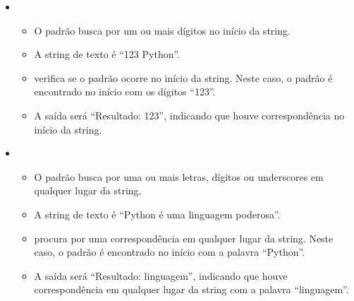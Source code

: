 \documentclass[letterpaper,10pt,english]{jupyterBook}
\begin{document}
\sphinxAtStartPar
{}
\begin{itemize}
\item {} 
\sphinxAtStartPar
{}
\begin{itemize}
\item {} 
\sphinxAtStartPar
O padrão  busca por um ou mais dígitos no início da string.

\item {} 
\sphinxAtStartPar
A string de texto é “123 Python”.

\item {} 
\sphinxAtStartPar
{} verifica se o padrão ocorre no início da string. Neste caso, o padrão é encontrado no início com os dígitos “123”.

\item {} 
\sphinxAtStartPar
A saída será “Resultado: 123”, indicando que houve correspondência no início da string.

\end{itemize}

\item {} 
\sphinxAtStartPar
{}
\begin{itemize}
\item {} 
\sphinxAtStartPar
O padrão  busca por uma ou mais letras, dígitos ou underscores em qualquer lugar da string.

\item {} 
\sphinxAtStartPar
A string de texto é “Python é uma linguagem poderosa”.

\item {} 
\sphinxAtStartPar
{} procura por uma correspondência em qualquer lugar da string. Neste caso, o padrão é encontrado no início com a palavra “Python”.

\item {} 
\sphinxAtStartPar
A saída será “Resultado: linguagem”, indicando que houve correspondência em qualquer lugar da string com a palavra “linguagem”.

\end{itemize}

\end{itemize}
\end{document}
